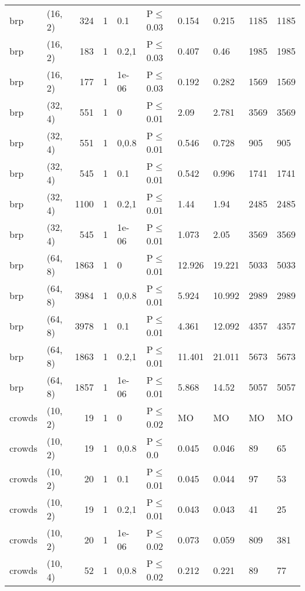 \begin{longtable}{llrrllllll}
 brp           & (16, 2)  &    	324 & 1 & 0.1   & P$\leq$0.03  & 0.154  & 0.215   & 1185    & 1185 \\
 brp           & (16, 2)  &    	183 & 1 & 0.2,1 & P$\leq$0.03  & 0.407  & 0.46    & 1985    & 1985 \\
 brp           & (16, 2)  &    	177 & 1 & 1e-06 & P$\leq$0.03  & 0.192  & 0.282   & 1569    & 1569 \\
 brp           & (32, 4)  &    	551 & 1 & 0     & P$\leq$0.01  & 2.09   & 2.781   & 3569    & 3569 \\
 brp           & (32, 4)  &    	551 & 1 & 0,0.8 & P$\leq$0.01  & 0.546  & 0.728   & 905     & 905  \\
 brp           & (32, 4)  &    	545 & 1 & 0.1   & P$\leq$0.01  & 0.542  & 0.996   & 1741    & 1741 \\
 brp           & (32, 4)  &   	1100 & 1 & 0.2,1 & P$\leq$0.01  & 1.44   & 1.94    & 2485    & 2485 \\
 brp           & (32, 4)  &    	545 & 1 & 1e-06 & P$\leq$0.01  & 1.073  & 2.05    & 3569    & 3569 \\
 brp           & (64, 8)  &   	1863 & 1 & 0     & P$\leq$0.01  & 12.926 & 19.221  & 5033    & 5033 \\
 brp           & (64, 8)  &   	3984 & 1 & 0,0.8 & P$\leq$0.01  & 5.924  & 10.992  & 2989    & 2989 \\
 brp           & (64, 8)  &   	3978 & 1 & 0.1   & P$\leq$0.01  & 4.361  & 12.092  & 4357    & 4357 \\
 brp           & (64, 8)  &   	1863 & 1 & 0.2,1 & P$\leq$0.01  & 11.401 & 21.011  & 5673    & 5673 \\
 brp           & (64, 8)  &   	1857 & 1 & 1e-06 & P$\leq$0.01  & 5.868  & 14.52   & 5057    & 5057 \\
 crowds        & (10, 2)  &     	19 & 1 & 0     & P$\leq$0.02  & MO     & MO      & MO      & MO   \\
 crowds        & (10, 2)  &     	19 & 1 & 0,0.8 & P$\leq$0.0   & 0.045  & 0.046   & 89      & 65   \\
 crowds        & (10, 2)  &     	20 & 1 & 0.1   & P$\leq$0.01  & 0.045  & 0.044   & 97      & 53   \\
 crowds        & (10, 2)  &     	19 & 1 & 0.2,1 & P$\leq$0.01  & 0.043  & 0.043   & 41      & 25   \\
 crowds        & (10, 2)  &     	20 & 1 & 1e-06 & P$\leq$0.02  & 0.073  & 0.059   & 809     & 381  \\
 crowds        & (10, 4)  &     	52 & 1 & 0,0.8 & P$\leq$0.02  & 0.212  & 0.221   & 89      & 77   \\

\end{longtable}
